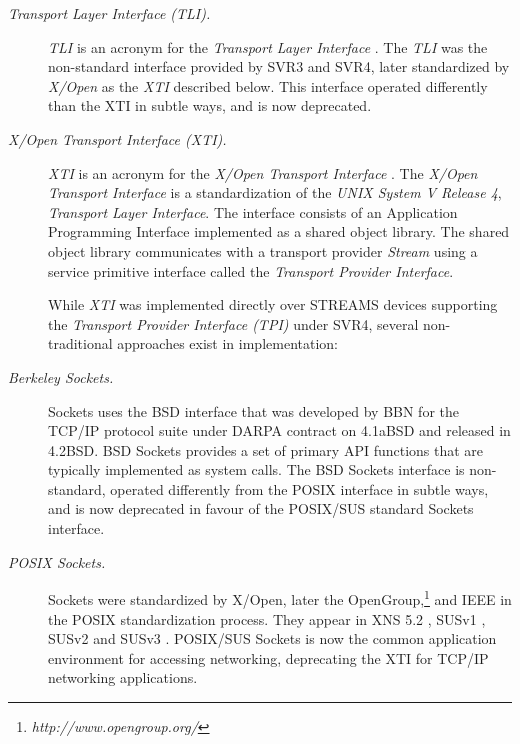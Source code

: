 \documentclass[letterpaper,final,notitlepage,twocolumn,10pt,twoside]{article}
\begin{document}
\begin{description}

\item[{\it Transport Layer Interface (TLI).}]

\textsl{TLI} is an acronym for the \textit{Transport Layer Interface}
\cite[]{tli}.  The \textsl{TLI} was the non-standard interface provided by
SVR3 and SVR4, later standardized by \textit{X/Open} as the \textsl{XTI}
described below.  This interface operated differently than the XTI in subtle
ways, and is now deprecated.

\item[{\it X/Open Transport Interface (XTI).}]

\textsl{XTI} is an acronym for the \textsl{X/Open Transport Interface}
\cite[]{xti}.  The \textsl{X/Open Transport Interface} is a standardization of
the \textsl{UNIX System V Release 4}, \textsl{Transport Layer Interface}.  The
interface consists of an Application Programming Interface implemented as a
shared object library.  The shared object library communicates with a
transport provider \textit{Stream} using a service primitive interface called
the \textit{Transport Provider Interface}\cite[]{tpi}.

While \textsl{XTI} was implemented directly over STREAMS devices supporting
the \textit{Transport Provider Interface (TPI)} \cite[]{tpi} under SVR4,
several non-traditional approaches exist in implementation:

\item[{\it Berkeley Sockets.}]

Sockets uses the BSD interface that was developed by BBN for the TCP/IP
protocol suite under DARPA contract on 4.1aBSD and released in 4.2BSD.  BSD
Sockets provides a set of primary API functions that are typically implemented
as system calls.  The BSD Sockets interface is non-standard, operated
differently from the POSIX interface in subtle ways, and is now deprecated in
favour of the POSIX/SUS standard Sockets interface.

\item[{\it POSIX Sockets.}]

Sockets were standardized by X/Open, later the
OpenGroup,\footnote{\textit{http://www.opengroup.org/}} and IEEE in the POSIX
standardization process.  They appear in XNS 5.2 \cite[]{xns}, SUSv1
\cite[]{susv1}, SUSv2 \cite[]{susv2} and SUSv3 \cite[]{susv3}.   POSIX/SUS
Sockets is now the common application environment for accessing networking,
deprecating the XTI for TCP/IP networking applications.

\end{description}
\end{document}
